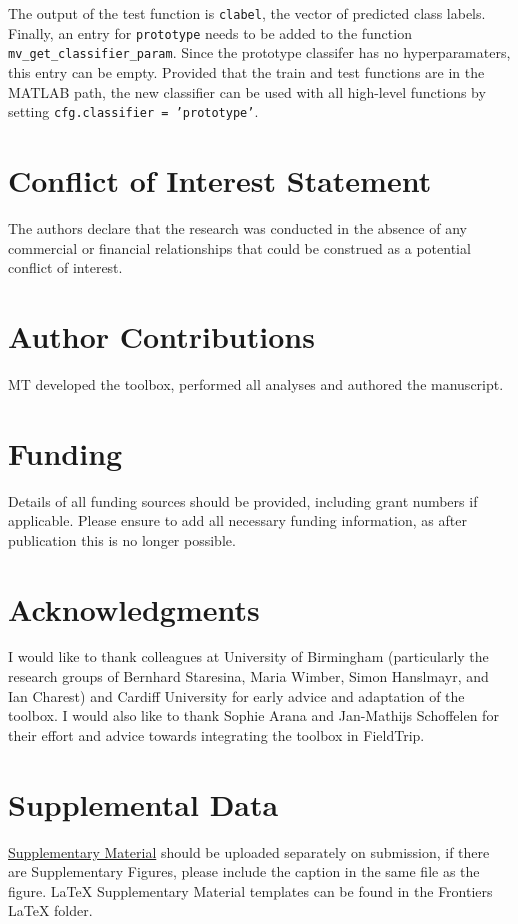 \documentclass[utf8]{frontiersSCNS} %
\newcommand{\ttt}[1]{\texttt{#1}}
\begin{document}
The output of the test function is \ttt{clabel}, the vector of predicted class labels. Finally, an entry for \ttt{prototype} needs to be added to the function \ttt{mv\_get\_classifier\_param}. Since the prototype classifer has no hyperparamaters, this entry can be empty. Provided that the train and test functions are in the MATLAB path, the new classifier can be used with all high-level functions by setting \ttt{cfg.classifier = 'prototype'}.


\section*{Conflict of Interest Statement}

The authors declare that the research was conducted in the absence of any commercial or financial relationships that could be construed as a potential conflict of interest.

\section*{Author Contributions}

MT developed the toolbox, performed all analyses and authored the manuscript.

\section*{Funding}
Details of all funding sources should be provided, including grant numbers if applicable. Please ensure to add all necessary funding information, as after publication this is no longer possible.

\section*{Acknowledgments}
I would like to thank colleagues at University of Birmingham (particularly the research groups of Bernhard Staresina, Maria Wimber, Simon Hanslmayr, and Ian Charest) and Cardiff University for early advice and adaptation of the toolbox. 
I would also like to thank Sophie Arana and Jan-Mathijs Schoffelen for their effort and advice towards integrating the toolbox in FieldTrip.

\section*{Supplemental Data}
 \href{http://home.frontiersin.org/about/author-guidelines#SupplementaryMaterial}{Supplementary Material} should be uploaded separately on submission, if there are Supplementary Figures, please include the caption in the same file as the figure. LaTeX Supplementary Material templates can be found in the Frontiers LaTeX folder.
\end{document}
